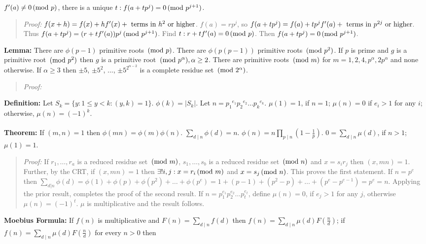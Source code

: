 $f'(a) \ne 0 \thinspace \textnormal{(mod } p \textnormal{)}$, there is a unique $t: f(a+tp^j)= 0 \thinspace \textnormal{(mod } p^{j+1} \textnormal{)}$.
\begin{quote}
\emph{Proof:} 
$f(x+h)= f(x)+ h f'(x)+ \textnormal{ terms in } h^2 \textnormal{ or higher}$.  $f(a)= rp^j$, so
$f(a+tp^j)= f(a)+ tp^j f'(a) + \textnormal{ terms in } p^{2j} \textnormal{ or higher}$.  Thus
$f(a+t p^j)= (r+t f'(a)) p^j \thinspace \textnormal{(mod } p^{j+1} \textnormal{)}$.   Find $t: r+t f'(a) = 0 \thinspace \textnormal{(mod } p \textnormal{)}$.  Then
$f(a+tp^j)= 0 \thinspace \textnormal{(mod } p^{j+1} \textnormal{)}$.
\end{quote}
{\bf Lemma:}  There are $\phi(p-1)$ primitive roots $\thinspace \textnormal{(mod } p \textnormal{)}$.  There are $\phi(p(p-1))$ primitive roots $\thinspace \textnormal{(mod } p^2 \textnormal{)}$.
If $p$ is prime and $g$ is a primitive root $\thinspace \textnormal{(mod } p^2 \textnormal{)}$ then $g$ is a primitive root $\thinspace \textnormal{(mod } p^{\alpha} \textnormal{)}, \alpha \ge 2$.
There are primitive roots $\thinspace \textnormal{(mod } m \textnormal{)}$ for $m = 1, 2, 4, p^{\alpha}, 2 p^{\alpha}$ and none otherwise. If
$\alpha \ge 3$ then $\pm 5$, $\pm 5^2$, ..., $\pm 5^{2^{\alpha - 2}}$ is a complete residue set $\thinspace \textnormal{(mod } 2^{\alpha} \textnormal{)}$.
\begin{quote}
\emph{Proof:} 
\end{quote}
{\bf Definition:} Let $S_k = \{y: 1 \leq y <k: (y,k)=1 \}$.  $\phi(k)= |S_k|$.
Let $n= {p_1}^{e_1} {p_2}^{e_2} \ldots {p_k}^{e_k}$.
$\mu(1)= 1$, if $n=1$; $\mu(n)=0$ if $e_i > 1$ for any $i$; otherwise, $\mu(n)= (-1)^k$.
\\
\\
{\bf Theorem:} 
If $(m,n)=1$ then $\phi(mn)= \phi(m) \phi(n)$.
$ \sum_{d \mid n} \phi(d)= n$.
$ \phi(n)=  n \prod_{p \mid n} (1- {\frac {1} {p}})$.
$ 0=  \sum_{d \mid n} \mu(d)$, if $n>1$; $\mu(1)=1$.
\begin{quote}
\emph{Proof:}
If $r_1, \ldots, r_a$ is a reduced residue set $\thinspace \textnormal{(mod } m \textnormal{)}$,
$s_1, \ldots , s_b$ is a reduced residue set $\thinspace \textnormal{(mod } n \textnormal{)}$ and
$x= s_i r_j$ then $(x,mn)=1$.  Further, by the CRT, if
$(x, mn)=1$ then $\exists ! i, j: x= r_i \thinspace \textnormal{(mod } m \textnormal{)}$ and $x= s_j \thinspace \textnormal{(mod } n \textnormal{)}$.  This proves
the first statement.  If $n= p^e$ then
$\sum_{d|n} \phi(d)= \phi(1) + \phi(p) + \phi(p^2) + \ldots + \phi(p^e)=
1 + (p-1) + (p^2-p) + \ldots + (p^e - p^{e-1})= p^e = n$.  Applying the prior result,
completes the proof of the second result.  If $n= p_1^{e_1} p_2^{e_2} \ldots p_t^{e_t}$,
define $\mu(n)=0$, if $e_j > 1$ for any $j$, otherwise $\mu(n)= (-1)^t$.  $\mu$ is
multiplicative and the result follows.
\end{quote}
{\bf Moebius Formula:} If $f(n)$ is multiplicative and 
$F(n)=  \sum_{d \mid n} f(d)$ then
$f(n)= \sum_{d \mid n} \mu(d) F({\frac {n} {d}})$;  if
$f(n)= \sum_{d \mid n} \mu(d) F({\frac {n} {d}})$ for every $n>0$ then
